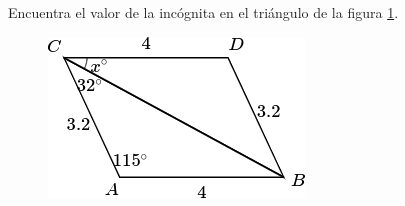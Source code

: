 Encuentra el valor de la incógnita en el triángulo de la figura \ref{fig:angle_triangle_17}.

\begin{minipage}[t][5cm][b]{0.3\textwidth}
    \begin{figure}[H]
        \centering
        \includegraphics[width=0.8\linewidth]{../images/angle_triangle_17.png}
        \caption{}
        \label{fig:angle_triangle_17}
    \end{figure}
\end{minipage}\hfill
\begin{minipage}[t]{0.65\textwidth}
    \begin{solutionbox}{5cm}

    \end{solutionbox}
\end{minipage}
